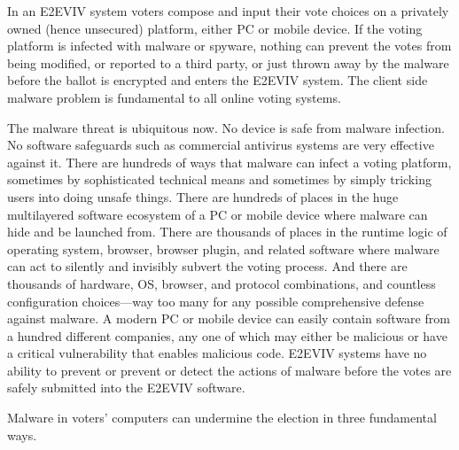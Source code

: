 In an E2EVIV system voters compose and input their vote choices on a
privately owned (hence unsecured) platform, either PC or mobile
device. If the voting platform is infected with malware or spyware,
nothing can prevent the votes from being modified, or reported to a
third party, or just thrown away by the malware before the ballot is
encrypted and enters the E2EVIV system. The client side malware
problem is fundamental to all online voting systems.

The malware threat is ubiquitous now. No device is safe from malware
infection. No software safeguards such as commercial antivirus systems
are very effective against it. There are hundreds of ways that malware
can infect a voting platform, sometimes by sophisticated technical
means and sometimes by simply tricking users into doing unsafe
things. There are hundreds of places in the huge multilayered software
ecosystem of a PC or mobile device where malware can hide and be
launched from. There are thousands of places in the runtime logic of
operating system, browser, browser plugin, and related software where
malware can act to silently and invisibly subvert the voting
process. And there are thousands of hardware, OS, browser, and
protocol combinations, and countless configuration choices---way too
many for any possible comprehensive defense against malware. A modern
PC or mobile device can easily contain software from a hundred
different companies, any one of which may either be malicious or have
a critical vulnerability that enables malicious code. E2EVIV systems
have no ability to prevent or prevent or detect the actions of malware
before the votes are safely submitted into the E2EVIV software.

Malware in voters' computers can undermine the election in three
fundamental ways. 

